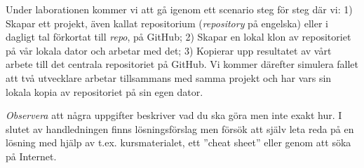 \noindent Under laborationen kommer vi att gå igenom ett scenario steg för steg där vi: 1) Skapar ett projekt, även kallat repositorium (\emph{repository} på engelska) eller i dagligt tal förkortat till  \emph{repo}, på GitHub; 2) Skapar en lokal klon av repositoriet på vår lokala dator och arbetar med det; 3) Kopierar upp resultatet av vårt arbete till det centrala repositoriet på GitHub. Vi kommer därefter simulera fallet att två utvecklare arbetar tillsammans med samma projekt och har vars sin lokala kopia av repositoriet på sin egen dator.

\emph{Observera} att några uppgifter beskriver vad du ska göra men inte exakt hur. I slutet av handledningen finns lösningsförslag men försök att själv leta reda på en lösning med hjälp av t.ex. kursmaterialet, ett ''cheat sheet'' eller genom att söka på Internet.

